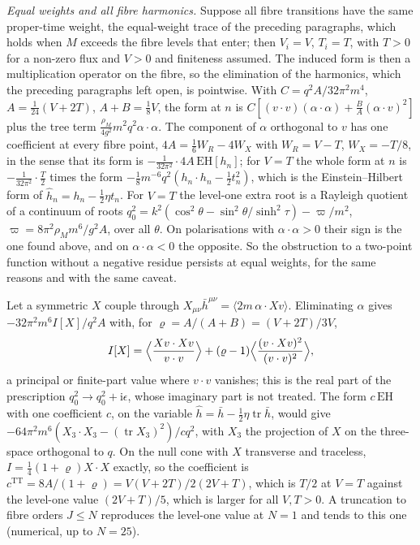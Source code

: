 \emph{Equal weights and all fibre harmonics.} Suppose all fibre transitions have the same proper-time weight, the equal-weight trace of the preceding paragraphs, which holds when \(M\) exceeds the fibre levels that enter; then \(V_i=V\), \(T_i=T\), with \(T>0\) for a non-zero flux and \(V>0\) and finiteness assumed. The induced form is then a multiplication operator on the fibre, so the elimination of the harmonics, which the preceding paragraphs left open, is pointwise. With \(C=q^2A/32\pi^2m^4\), \(A=\tfrac1{24}(V+2T)\), \(A+B=\tfrac18V\), the form at \(n\) is \(C[(v\cdot v)(\alpha\cdot\alpha)+\tfrac BA(\alpha\cdot v)^2]\) plus the tree term \(\tfrac{\rho_M}{4g^2}m^2q^2\alpha\cdot\alpha\). The component of \(\alpha\) orthogonal to \(v\) has one coefficient at every fibre point, \(4A=\tfrac16W_R-4W_X\) with \(W_R=V-T\), \(W_X=-T/8\), in the sense that its form is \(-\tfrac1{32\pi^2}\cdot4A\,\mathrm{EH}[h_n]\); for \(V=T\) the whole form at \(n\) is \(-\tfrac1{32\pi^2}\cdot\tfrac T2\) times the form \(-\tfrac18m^{-6}q^2(h_n\cdot h_n-\tfrac12t_n^2)\), which is the Einstein--Hilbert form of \(\hat h_n=h_n-\tfrac12\eta t_n\). For \(V=T\) the level-one extra root is a Rayleigh quotient of a continuum of roots \(q_0^2=k^2(\cos^2\theta-\sin^2\theta/\sinh^2\tau)-\varpi/m^2\), \(\varpi=8\pi^2\rho_Mm^6/g^2A\), over all \(\theta\). On polarisations with \(\alpha\cdot\alpha>0\) their sign is the one found above, and on \(\alpha\cdot\alpha<0\) the opposite. So the obstruction to a two-point function without a negative residue persists at equal weights, for the same reasons and with the same caveat.

Let a symmetric \(X\) couple through \(X_{\mu\nu}\bar h^{\mu\nu}=\langle2m\,\alpha\cdot Xv\rangle\). Eliminating \(\alpha\) gives \(-32\pi^2m^6I[X]/q^2A\) with, for \(\varrho=A/(A+B)=(V+2T)/3V\),
\[
I[X]=\Bigl\langle\frac{Xv\cdot Xv}{v\cdot v}\Bigr\rangle+(\varrho-1)\Bigl\langle\frac{(v\cdot Xv)^2}{(v\cdot v)^2}\Bigr\rangle,
\]
a principal or finite-part value where \(v\cdot v\) vanishes; this is the real part of the prescription \(q_0^2\to q_0^2+\mathrm i\epsilon\), whose imaginary part is not treated. The form \(c\,\mathrm{EH}\) with one coefficient \(c\), on the variable \(\hat h=\bar h-\tfrac12\eta\operatorname{tr}\bar h\), would give \(-64\pi^2m^6(X_3\cdot X_3-(\operatorname{tr}X_3)^2)/cq^2\), with \(X_3\) the projection of \(X\) on the three-space orthogonal to \(q\). On the null cone with \(X\) transverse and traceless, \(I=\tfrac14(1+\varrho)X\cdot X\) exactly, so the coefficient is \(c^{\mathrm{TT}}=8A/(1+\varrho)=V(V+2T)/2(2V+T)\), which is \(T/2\) at \(V=T\) against the level-one value \((2V+T)/5\), which is larger for all \(V,T>0\). A truncation to fibre orders \(J\le N\) reproduces the level-one value at \(N=1\) and tends to this one (numerical, up to \(N=25\)).

